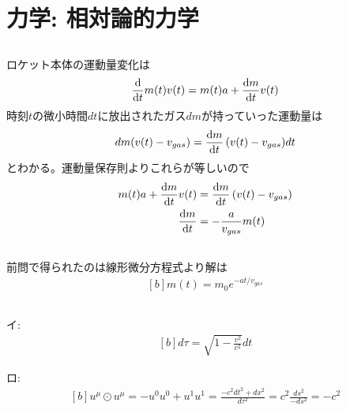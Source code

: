 \documentclass[../../sp_2015.tex]{subfiles}
\begin{document}
\section{力学: 相対論的力学}
\subsection{}
ロケット本体の運動量変化は
\begin{equation}\begin{aligned}[b]
    \dv{t}m(t)v(t) = m(t)a+\dv{m}{t}v(t)
\end{aligned}\end{equation}
時刻\(t\)の微小時間\(dt\)に放出されたガス\(dm\)が持っていった運動量は
\begin{equation}\begin{aligned}[b]
    dm(v(t)-v_{gas}) = \dv{m}{t}\,(v(t)-v_{gas}) dt
\end{aligned}\end{equation}
とわかる。運動量保存則よりこれらが等しいので
\begin{equation}\begin{aligned}[b]
    m(t)a+\dv{m}{t}v(t) &= \dv{m}{t}\,(v(t)-v_{gas})\\
    \dv{m}{t} &= -\frac{a}{v_{gas}}m(t)
\end{aligned}\end{equation}

\subsection{}
前問で得られたのは線形微分方程式より解は
\begin{equation}\begin{aligned}[b]
    m(t) = m_0e^{-at/v_{gas}}
\end{aligned}\end{equation}

\subsection{}
イ:
\begin{equation}\begin{aligned}[b]
     d\tau = \sqrt{1-\frac{v^2}{c^2}}dt
\end{aligned}\end{equation}

ロ:
\begin{equation}\begin{aligned}[b]
    u^\mu\odot u^\mu=-u^0u^0 + u^1u^1 = \frac{-c^2dt^2+dx^2}{d\tau^2} = c^2\frac{ds^2}{-ds^2}= -c^2
\end{aligned}\end{equation}
\end{document}
